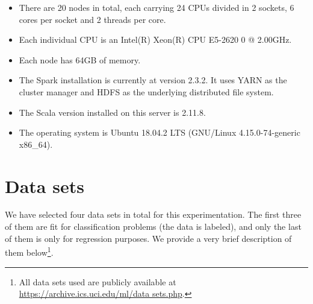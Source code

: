 \begin{itemize}
  \item There are 20 nodes in total, each carrying 24 CPUs divided in 2 sockets, 6 cores per socket and 2 threads per core.
  \item Each individual CPU is an Intel(R) Xeon(R) CPU E5-2620 0 @ 2.00GHz.
  \item Each node has 64GB of memory.
  \item The Spark installation is currently at version 2.3.2. It uses YARN as the cluster manager and HDFS as the underlying distributed file system.
  \item The Scala version installed on this server is 2.11.8.
  \item The operating system is Ubuntu 18.04.2 LTS (GNU/Linux 4.15.0-74-generic x86\_64).
\end{itemize}

\section{Data sets}

We have selected four data sets in total for this experimentation. The first three of them are fit for classification problems (the data is labeled), and only the last of them is only for regression purposes. We provide a very brief description of them below\footnote{All data sets used are publicly available at \url{https://archive.ics.uci.edu/ml/data sets.php}.}.


